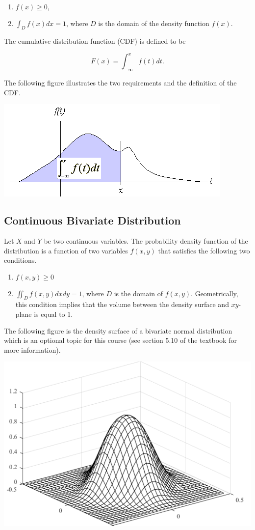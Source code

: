 \documentclass[
]{book}
\begin{document}
\begin{enumerate}
\def\labelenumi{\arabic{enumi}.}
\item
  \(f(x) \ge 0\),
\item
  \(\int_{D} f(x) dx = 1\), where \(D\) is the domain of the density function \(f(x)\).
\end{enumerate}

The cumulative distribution function (CDF) is defined to be

\[
F(x) = \int_{-\infty}^x f(t)dt.
\]

The following figure illustrates the two requirements and the definition of the CDF.

\begin{center}\includegraphics[width=0.5\linewidth]{topic06/univariateContinuoudDistCurve} \end{center}

\hypertarget{continuous-bivariate-distribution}{%
\subsection{Continuous Bivariate Distribution}\label{continuous-bivariate-distribution}}

Let \(X\) and \(Y\) be two continuous variables. The probability density function of the distribution is a function of two variables \(f(x,y)\) that satisfies the following two conditions.

\begin{enumerate}
\def\labelenumi{\arabic{enumi}.}
\item
  \(f(x,y) \ge 0\)
\item
  \(\iint_D f(x,y) dxdy = 1\), where \(D\) is the domain of \(f(x,y)\). Geometrically, this condition implies that the volume between the density surface and \(xy\)-plane is equal to 1.
\end{enumerate}

The following figure is the density surface of a bivariate normal distribution which is an optional topic for this course (see section 5.10 of the textbook for more information).

\begin{center}\includegraphics[width=0.4\linewidth]{topic06/bivariateNormalDist} \end{center}
\end{document}
